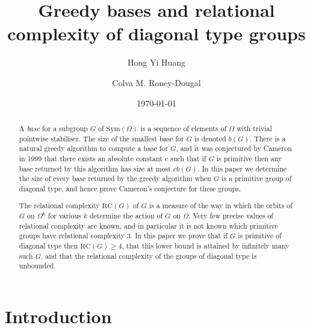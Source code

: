 \documentclass[twoside,a4paper,reqno,11pt]{amsart}
\newcommand{\RC}{\mathrm{RC}}
\newcommand{\<}{\langle}
\renewcommand{\>}{\rangle}
\newcommand{\geqs}{\geqslant}
\def\Sym{\mathrm{Sym}}
\theoremstyle{definition}
\begin{document}
\title{Greedy bases and relational complexity of diagonal type groups}
\begin{abstract}
  A \emph{base} for a subgroup $G$ of $\Sym(\Omega)$ is a sequence of elements of $\Omega$ with trivial pointwise stabiliser. The size of the smallest base for $G$ is denoted $b(G)$. There is a natural greedy algorithm to compute a base for $G$, and it was conjectured by Cameron in 1999 that there exists an absolute constant $c$ such that if $G$ is primitive then any base returned by this algorithm has size at most $cb(G)$. In this paper we determine the size of %
  every
  base returned by the greedy algorithm when $G$ is a primitive group of diagonal type, and hence prove Cameron's conjecture for these groups. 

  The relational complexity $\RC(G)$ of $G$ is a measure of the way in which the orbits of $G$ on $\Omega^k$ for various $k$ determine the action of $G$ on $\Omega$. Very few precise values of relational complexity are known, and in particular it is not known which primitive groups have relational complexity $3$. In this paper we prove that if $G$ is primitive of diagonal type then $\RC(G) \geqs 4$, that this lower bound is attained by infinitely many such $G$, and that the relational complexity of the groups of diagonal type is unbounded. 
 \end{abstract}

\date{\today}

\author{Hong Yi Huang}
    \address{H.Y. Huang, Department of Mathematics, Southern University of Science and Technology, Shenzhen 518055, Guangdong, P. R. China}

\author{Colva M. Roney-Dougal}
    \address{C.M. Roney-Dougal, School of Mathematics and Statistics, University of St Andrews, St Andrews, UK}


\maketitle



	
\section{Introduction}
\end{document}
